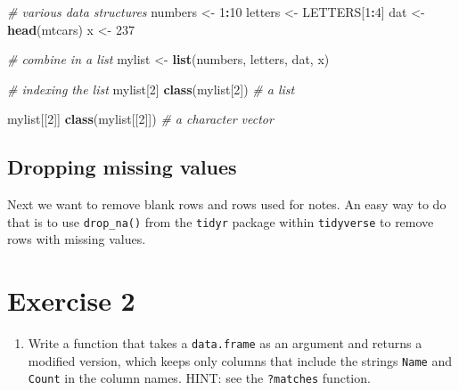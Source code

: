 \documentclass[]{book}
\newenvironment{Shaded}{\begin{snugshade}}{\end{snugshade}}
\newcommand{\KeywordTok}[1]{\textcolor[rgb]{0.13,0.29,0.53}{\textbf{#1}}}
\newcommand{\DecValTok}[1]{\textcolor[rgb]{0.00,0.00,0.81}{#1}}
\newcommand{\StringTok}[1]{\textcolor[rgb]{0.31,0.60,0.02}{#1}}
\newcommand{\CommentTok}[1]{\textcolor[rgb]{0.56,0.35,0.01}{\textit{#1}}}
\newcommand{\OperatorTok}[1]{\textcolor[rgb]{0.81,0.36,0.00}{\textbf{#1}}}
\newcommand{\NormalTok}[1]{#1}
\providecommand{\tightlist}{%
  \setlength{\itemsep}{0pt}\setlength{\parskip}{0pt}}
\begin{document}
\begin{Shaded}
\begin{Highlighting}[]
\CommentTok{# various data structures}
\NormalTok{numbers <-}\StringTok{ }\DecValTok{1}\OperatorTok{:}\DecValTok{10}
\NormalTok{letters <-}\StringTok{ }\NormalTok{LETTERS[}\DecValTok{1}\OperatorTok{:}\DecValTok{4}\NormalTok{]}
\NormalTok{dat <-}\StringTok{ }\KeywordTok{head}\NormalTok{(mtcars)}
\NormalTok{x <-}\StringTok{ }\DecValTok{237}

\CommentTok{# combine in a list}
\NormalTok{mylist <-}\StringTok{ }\KeywordTok{list}\NormalTok{(numbers, letters, dat, x)}

\CommentTok{# indexing the list}
\NormalTok{mylist[}\DecValTok{2}\NormalTok{]}
\KeywordTok{class}\NormalTok{(mylist[}\DecValTok{2}\NormalTok{]) }\CommentTok{# a list}

\NormalTok{mylist[[}\DecValTok{2}\NormalTok{]]}
\KeywordTok{class}\NormalTok{(mylist[[}\DecValTok{2}\NormalTok{]]) }\CommentTok{# a character vector}
\end{Highlighting}
\end{Shaded}

\subsection{Dropping missing values}\label{dropping-missing-values}

Next we want to remove blank rows and rows used for notes. An easy way
to do that is to use \texttt{drop\_na()} from the \texttt{tidyr} package
within \texttt{tidyverse} to remove rows with missing values.

\begin{Shaded}
\end{Shaded}

\section{Exercise 2}\label{exercise-2-2}

\begin{enumerate}
\def\labelenumi{\arabic{enumi}.}
\tightlist
\item
  Write a function that takes a \texttt{data.frame} as an argument and
  returns a modified version, which keeps only columns that include the
  strings \texttt{Name} and \texttt{Count} in the column names. HINT:
  see the \texttt{?matches} function.
\end{enumerate}
\end{document}
